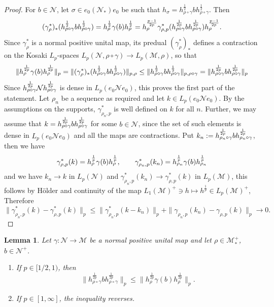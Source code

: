 \documentclass[12pt]{article}
\newtheorem{lemma}[theorem]{Lemma}
\theoremstyle{definition}
\theoremstyle{remark}
\numberwithin{equation}{section}
\def\Me{\mathcal M}
\def\Ne{\mathcal N}
\begin{document}
\begin{proof} For $b\in \Ne$, let $\sigma\in e_0 (\Ne_*)e_0$ be such that
$h_\sigma=h_{\rho\circ\gamma}^{\frac12}b h_{\rho\circ\gamma}^{\frac12}$. Then
\[
(\gamma^*_\rho)_*(h_{\rho\circ\gamma}^{\frac12}b
h_{\rho\circ\gamma}^{\frac12})=h_\rho^{\frac12}\gamma(b)h_\rho^{\frac12}=h_\rho^{p-1\over
2p}\gamma^*_{\rho,p}(h_{\rho\circ\gamma}^{1\over 2p}bh_{\rho\circ\gamma}^{1\over
2p})h_\rho^{p-1\over 2p}.
\]
Since $\gamma^*_\rho$ is a normal positive unital map, its predual $(\gamma^*_\rho)_*$
defines  a contraction on the Kosaki $L_p$-spaces  $L_p(\Ne,\rho\circ\gamma)\to L_p(\Me,\rho)$, so that 
\[
\|h_\rho^{1\over 2p}\gamma(b) h_\rho^{1\over 2p}\|_p=\|(\gamma^*_\rho)_*(h_{\rho\circ\gamma}^{\frac12}b
h_{\rho\circ\gamma}^{\frac12})\|_{p,\rho}\le \|h_{\rho\circ\gamma}^{\frac12}b
h_{\rho\circ\gamma}^{\frac12}\|_{p,\rho\circ\gamma}=\|h_{\rho\circ\gamma}^{1\over 2p}b
h_{\rho\circ\gamma}^{1\over 2p}\|_p
\]
Since $h_{\rho\circ\gamma}^{1\over 2p}\Ne h^{1\over
2p}_{\rho\circ\gamma}$ is dense in $L_p(e_0 \Ne e_0)$, this proves the first part of the
statement.  Let $\rho_n$ be a sequence as required and let $k\in L_p(e_0 \Ne e_0)$. By the
assumptions on the supports, $\gamma^*_{\rho_n,p}$ is well defined on $k$ for all $n$.
Further, we may assume that $k=h_{\rho\circ\gamma}^{1\over 2p}b
h_{\rho\circ\gamma}^{1\over 2p}$ for some $b\in \Ne$, since the set of such elements is
dense in $L_p(e_0 \Ne e_0)$ and all the maps are contractions. 
Put $k_n:=h_{\rho_n\circ\gamma}^{1\over 2p}b
h_{\rho_n\circ\gamma}^{1\over 2p}$, then we have
\[
\gamma^*_{\rho,p}(k)=h_\rho^{1\over p}\gamma(b)h_\rho^{1\over p},\qquad
\gamma^*_{\rho_n,p}(k_n)= h_{\rho_n}^{1\over p}\gamma(b)h_{\rho_n}^{1\over p}
\]
and we have $k_n\to k$ in $L_p(\Ne)$ and  $\gamma^*_{\rho_n,p}(k_n)\to
\gamma^*_{\rho,p}(k)$ in $L_p(\Me)$, this follows by H\"older and continuity of the map
$L_1(\Me)^+\ni h\mapsto h^{\frac1p}\in L_p(\Me)^+$, %
Therefore
\[
\|\gamma^*_{\rho_n,p}(k)-\gamma^*_{\rho,p}(k)\|_p\le
\|\gamma^*_{\rho_n,p}(k-k_n)\|_p+\|\gamma_{\rho_n,p}(k_n)-\gamma_{\rho,p}(k)\|_p\to 0.
\]


\end{proof}


\begin{lemma}\label{lemma:dpi} Let $\gamma:\Ne\to \Me$ be a normal positive unital map and
let $\rho\in \Me_*^+$, $b\in \Ne^+$. 
\begin{enumerate}
\item[(i)]  If $p\in [1/2,1)$, then 
\[
\|h_{\rho\circ\gamma}^{\frac{1}{2p}}bh_{\rho\circ\gamma}^{\frac{1}{2p}}\|_p\le
\|h_{\rho}^{\frac{1}{2p}}\gamma(b)h_{\rho}^{\frac{1}{2p}}\|_p.
\]

\item[(ii)]  If $p\in [1,\infty]$, the inequality reverses.

\end{enumerate}


\end{lemma}
\end{document}
